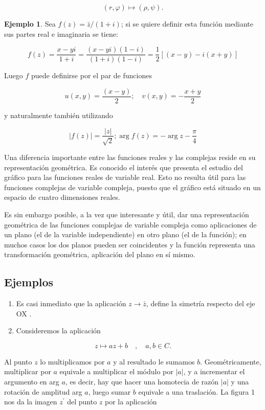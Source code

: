 \documentclass[10pt]{article}
\theoremstyle{plain}
\theoremstyle{definition}
\newtheorem{example}[theorem]{Ejemplo}
\theoremstyle{remark}
\begin{document}
$$
(r, \varphi) \mapsto(\rho, \psi) .
$$

\begin{example}
Sea $f(z)=\bar{z} / (1+i)$; si se quiere definir esta función mediante sus partes real e imaginaria se tiene:

$$
f(z)=\frac{x-y i}{1+i}=\frac{(x-y i)(1-i)}{(1+i)(1-i)}=\frac{1}{2}[(x-y)-i(x+y)]
$$


Luego $f$ puede definirse por el par de funciones

$$
u(x, y)=\frac{(x-y)}{2} ; \quad v(x, y)=-\frac{x+y}{2}
$$

y naturalmente también utilizando

$$
|f(z)|=\frac{|z|}{\sqrt{2}} ; \arg f(z)=-\arg z-\frac{\pi}{4}
$$
\end{example}

Una diferencia importante entre las funciones reales y las complejas reside en su representación geométrica. Es conocido el interés que presenta el estudio del gráfico para las funciones reales de variable real. Esto no resulta útil para las funciones complejas de variable compleja, puesto que el gráfico está situado en un espacio de cuatro dimensiones reales.

Es sin embargo posible, a la vez que interesante y útil, dar una representación geométrica de las funciones complejas de variable compleja como aplicaciones de un plano (el de la variable independiente) en otro plano (el de la función); en muchos casos los dos planos pueden ser coincidentes y la función representa una transformación geométrica, aplicación del plano en sí mismo.

\subsection*{Ejemplos}
\begin{enumerate}
  \item Es casi inmediato que la aplicación $z \rightarrow \bar{z}$, define la simetría respecto del eje OX .
  \item Consideremos la aplicación
\end{enumerate}


\begin{equation*}
z \mapsto a z+b \quad, \quad a, b \in C . \tag{$2\cdot1$}
\end{equation*}


Al punto $z$ lo multiplicamos por $a$ y al resultado le sumamos $b$.
Geométricamente, multiplicar por $a$ equivale a multiplicar el módulo por $|a|$, y a incrementar el argumento en arg $a$, es decir, hay que hacer una homotecia de razón $|a|$ y una rotación de amplitud arg $a$, luego sumar $b$ equivale a una traslación. La figura 1 nos da la imagen $z^{\prime}$ del punto $z$ por la aplicación
\end{document}
